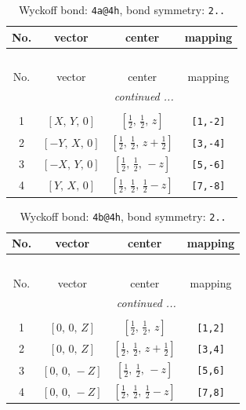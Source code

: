 \documentclass[fleqn,8pt]{jsarticle}
\begin{document}
\begin{longtable}{cccc}
\caption{Wyckoff bond: {\tt 4a@4h}, bond symmetry: {\tt 2..}}
 \\
 \hline \hline
No. & vector & center & mapping \\ \hline \endfirsthead

\multicolumn{3}{l}{\tablename\ \thetable{}} \\
 \hline \hline
No. & vector & center & mapping \\ \hline \endhead

 \hline \hline
\multicolumn{3}{r}{\footnotesize\it continued ...} \\ \endfoot

 \hline \hline
\multicolumn{3}{r}{} \\ \endlastfoot

1 & $\left[ X,\, Y,\, 0 \right]$ & $\left[ \frac{1}{2},\, \frac{1}{2},\, z \right]$ & {\tt [1,-2]} \\ \hline
2 & $\left[ - Y,\, X,\, 0 \right]$ & $\left[ \frac{1}{2},\, \frac{1}{2},\, z + \frac{1}{2} \right]$ & {\tt [3,-4]} \\ \hline
3 & $\left[ - X,\, Y,\, 0 \right]$ & $\left[ \frac{1}{2},\, \frac{1}{2},\, - z \right]$ & {\tt [5,-6]} \\ \hline
4 & $\left[ Y,\, X,\, 0 \right]$ & $\left[ \frac{1}{2},\, \frac{1}{2},\, \frac{1}{2} - z \right]$ & {\tt [7,-8]} \\
\end{longtable}
\renewcommand{\arraystretch}{1.2}
\begin{longtable}{cccc}
\caption{Wyckoff bond: {\tt 4b@4h}, bond symmetry: {\tt 2..}}
 \\
 \hline \hline
No. & vector & center & mapping \\ \hline \endfirsthead

\multicolumn{3}{l}{\tablename\ \thetable{}} \\
 \hline \hline
No. & vector & center & mapping \\ \hline \endhead

 \hline \hline
\multicolumn{3}{r}{\footnotesize\it continued ...} \\ \endfoot

 \hline \hline
\multicolumn{3}{r}{} \\ \endlastfoot

1 & $\left[ 0,\, 0,\, Z \right]$ & $\left[ \frac{1}{2},\, \frac{1}{2},\, z \right]$ & {\tt [1,2]} \\ \hline
2 & $\left[ 0,\, 0,\, Z \right]$ & $\left[ \frac{1}{2},\, \frac{1}{2},\, z + \frac{1}{2} \right]$ & {\tt [3,4]} \\ \hline
3 & $\left[ 0,\, 0,\, - Z \right]$ & $\left[ \frac{1}{2},\, \frac{1}{2},\, - z \right]$ & {\tt [5,6]} \\ \hline
4 & $\left[ 0,\, 0,\, - Z \right]$ & $\left[ \frac{1}{2},\, \frac{1}{2},\, \frac{1}{2} - z \right]$ & {\tt [7,8]} \\
\end{longtable}
\end{document}
